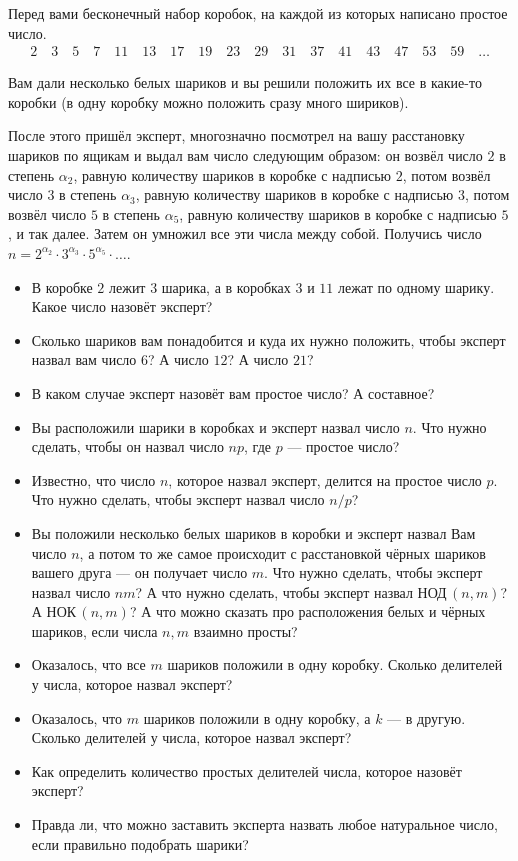 
Перед вами бесконечный набор коробок, на каждой из которых написано простое число. 
\begin{align*}
2 \quad 3 \quad 5 \quad 7 \quad 11 \quad 13 \quad 17 \quad 19 \quad 23 \quad 29 \quad 31 \quad 37 \quad 41 \quad 43 \quad 47 \quad 53 \quad 59 \quad \ldots
\end{align*}

Вам дали несколько белых шариков и вы решили положить их все в какие-то коробки (в одну коробку можно положить сразу много шириков). \medskip

После этого пришёл эксперт, многозначно посмотрел на вашу расстановку шариков по ящикам и выдал вам число следующим образом: он возвёл число $2$ в степень $\alpha_2$, равную количеству шариков в коробке с надписью $2$, потом возвёл число $3$ в степень $\alpha_3$, равную количеству шариков в коробке с надписью $3$, потом возвёл число $5$ в степень $\alpha_5$, равную количеству шариков в коробке с надписью $5$, и так далее. Затем он умножил все эти числа между собой. Получись число $n = 2^{\alpha_2}\cdot 3^{\alpha_3}\cdot 5^{\alpha_5}\cdot \ldots$.

\begin{itemize}
\item В коробке $2$ лежит $3$ шарика, а в коробках $3$ и $11$ лежат по одному шарику. Какое число назовёт эксперт?
\item Сколько шариков вам понадобится и куда их нужно положить, чтобы эксперт назвал вам число $6$? А число $12$? А число $21$?
\item В каком случае эксперт назовёт вам простое число? А составное? 
\item Вы расположили шарики в коробках и эксперт назвал число $n$. Что нужно сделать, чтобы он назвал число $np$, где $p$ --- простое число?
\item Известно, что число $n$, которое назвал эксперт, делится на простое число $p$. Что нужно сделать, чтобы эксперт назвал число $n/p$?
\item Вы положили несколько белых шариков в коробки и эксперт назвал Вам число $n$, а потом то же самое происходит с расстановкой чёрных шариков вашего друга --- он получает число $m$. Что нужно сделать, чтобы эксперт назвал число $nm$? А что нужно сделать, чтобы эксперт назвал НОД\,$(n,m)$? А НОК\,$(n,m)$? А что можно сказать про расположения белых и чёрных шариков, если числа $n,m$ взаимно просты?
\item Оказалось, что все $m$ шариков положили в одну коробку. Сколько делителей у числа, которое назвал эксперт?
\item Оказалось, что $m$ шариков положили в одну коробку, а $k$ --- в другую. Сколько делителей у числа, которое назвал эксперт?
\item Как определить количество простых делителей числа, которое назовёт эксперт?
\item Правда ли, что можно заставить эксперта назвать любое натуральное число, если правильно подобрать шарики?

\end{itemize}
